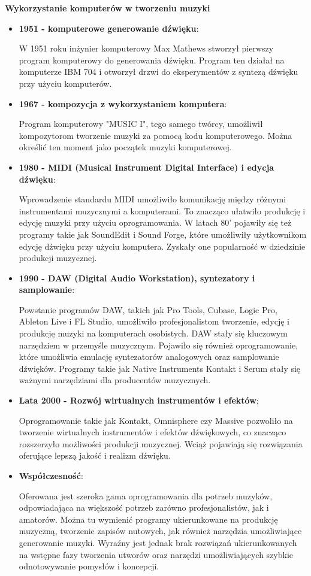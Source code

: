 \documentclass[12pt]{article}
\begin{document}
\textbf{Wykorzystanie komputerów w tworzeniu muzyki}
\begin{itemize}
	\item \textbf{1951 - komputerowe generowanie dźwięku}:
	      
	      W 1951 roku inżynier komputerowy Max Mathews stworzył pierwszy program komputerowy do generowania dźwięku.
	      Program ten działał na komputerze IBM 704 i otworzył drzwi do eksperymentów z syntezą dźwięku przy użyciu komputerów.
	\item \textbf{1967 - kompozycja z wykorzystaniem komputera}:
	      
	      Program komputerowy "MUSIC I", tego samego twórcy, umożliwił kompozytorom tworzenie muzyki za pomocą kodu komputerowego.
	      Można określić ten moment jako początek muzyki komputerowej.
	\item \textbf{1980 - MIDI (Musical Instrument Digital Interface) i edycja dźwięku}:
	      
	      Wprowadzenie standardu MIDI umożliwiło komunikację między różnymi instrumentami muzycznymi a komputerami.
	      To znacząco ułatwiło produkcję i edycję muzyki przy użyciu oprogramowania.
	      W latach 80' pojawiły się też programy takie jak SoundEdit i Sound Forge,
	      które umożliwiły użytkownikom edycję dźwięku przy użyciu komputera.
	      Zyskały one popularność w dziedzinie produkcji muzycznej.
	\item \textbf{1990 - DAW (Digital Audio Workstation), syntezatory i samplowanie}:
	      
	      Powstanie programów DAW, takich jak Pro Tools, Cubase, Logic Pro, Ableton Live i FL Studio, umożliwiło profesjonalistom tworzenie,
	      edycję i produkcję muzyki na komputerach osobistych.
	      DAW stały się kluczowym narzędziem w przemyśle muzycznym.
	      Pojawiło się również oprogramowanie, które umożliwia emulację syntezatorów analogowych oraz samplowanie dźwięków.
	      Programy takie jak Native Instruments Kontakt i Serum stały się ważnymi narzędziami dla producentów muzycznych.
	\item \textbf{Lata 2000 - Rozwój wirtualnych instrumentów i efektów};
	      
	      Oprogramowanie takie jak Kontakt, Omnisphere czy Massive pozwoliło na tworzenie wirtualnych instrumentów i efektów dźwiękowych,
	      co znacząco rozszerzyło możliwości produkcji muzycznej.
	      Wciąż pojawiają się rozwiązania oferujące lepszą jakość i realizm dźwięku.
	\item \textbf{Współczesność}:
	      
	      Oferowana jest szeroka gama oprogramowania dla potrzeb muzyków, odpowiadająca na większość potrzeb zarówno profesjonalistów,
	      jak i amatorów.
	      Można tu wymienić programy ukierunkowane na produkcję muzyczną, tworzenie zapisów nutowych,
	      jak również narzędzia umożliwiające generowanie muzyki.
	      Wyraźny jest jednak brak rozwiązań ukierunkowanych na wstępne fazy tworzenia utworów oraz narzędzi umożliwiających szybkie
	      odnotowywanie pomysłów i koncepcji.
\end{itemize}
\end{document}
